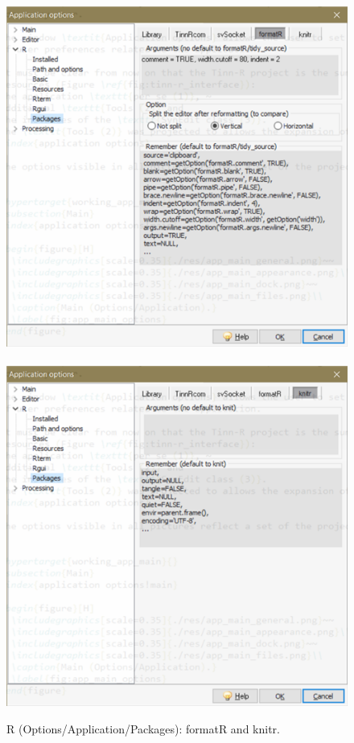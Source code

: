 \begin{figure}[h!]
  \includegraphics[scale=0.6]{./res/app_r_packages_formatr.png}~~
  \includegraphics[scale=0.6]{./res/app_r_packages_knitr.png}\\
  \caption{R (Options/Application/Packages): formatR and knitr.}
  \label{fig:app_r_c}
\end{figure}


